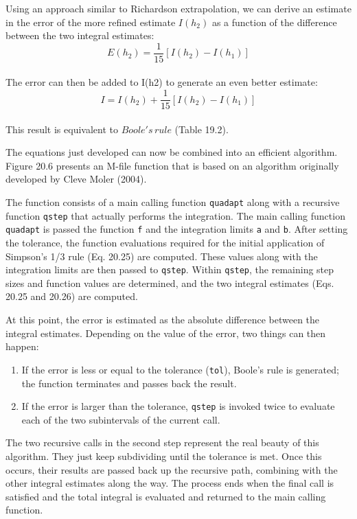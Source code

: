 \documentclass[../main.tex]{subfiles}
\begin{document}
Using an approach similar to Richardson extrapolation, we can derive an estimate in
the error of the more refined estimate $I(h_2)$ as a function of the difference between the two
integral estimates:
\begin{equation}
	\tag{20.29}
	E(h_2)=\dfrac{1}{15}[I(h_2)-I(h_1)]
\end{equation}\\
The error can then be added to I(h2) to generate an even better estimate:
\begin{equation}
	\tag{20.30}
	I=I(h_2)+\dfrac{1}{15}[I(h_2)-I(h_1)]
\end{equation}\\
This result is equivalent to $Boole's \, rule$ (Table 19.2). 

The equations just developed can now be combined into an efficient algorithm. Figure 20.6 presents an M-file function that is based on an algorithm originally developed
by Cleve Moler (2004). 

The function consists of a main calling function \texttt{quadapt} along with a recursive function \texttt{qstep} that actually performs the integration. The main calling function \texttt{quadapt} is passed the function \texttt{f} and the integration limits \texttt{a} and \texttt{b}. After setting the tolerance, the
function evaluations required for the initial application of Simpson's 1/3 rule (Eq. 20.25)
are computed. These values along with the integration limits are then passed to \texttt{qstep}. Within \texttt{qstep}, the remaining step sizes and function values are determined, and the two
integral estimates (Eqs. 20.25 and 20.26) are computed.

At this point, the error is estimated as the absolute difference between the integral
estimates. Depending on the value of the error, two things can then happen:

\begin{enumerate}
	\item If the error is less or equal to the tolerance (\texttt{tol}), Boole's rule is generated; the function terminates and passes back the result.
	\item If the error is larger than the tolerance, \texttt{qstep} is invoked twice to evaluate each of the
two subintervals of the current call.
\end{enumerate}

The two recursive calls in the second step represent the real beauty of this algorithm.
They just keep subdividing until the tolerance is met. Once this occurs, their results are
passed back up the recursive path, combining with the other integral estimates along the
way. The process ends when the final call is satisfied and the total integral is evaluated and
returned to the main calling function. 
\end{document}
